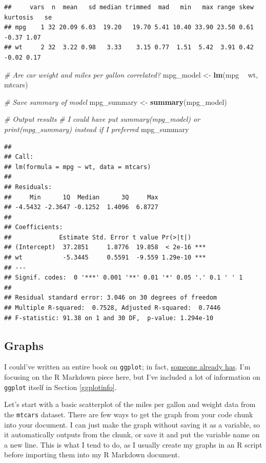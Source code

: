 \documentclass[
  openany]{book}
\newenvironment{Shaded}{\begin{snugshade}}{\end{snugshade}}
\newcommand{\CommentTok}[1]{\textcolor[rgb]{0.56,0.35,0.01}{\textit{#1}}}
\newcommand{\KeywordTok}[1]{\textcolor[rgb]{0.13,0.29,0.53}{\textbf{#1}}}
\newcommand{\NormalTok}[1]{#1}
\newcommand{\OperatorTok}[1]{\textcolor[rgb]{0.81,0.36,0.00}{\textbf{#1}}}
\newcommand{\StringTok}[1]{\textcolor[rgb]{0.31,0.60,0.02}{#1}}
\begin{document}
\begin{verbatim}
##     vars  n  mean   sd median trimmed  mad   min   max range skew kurtosis   se
## mpg    1 32 20.09 6.03  19.20   19.70 5.41 10.40 33.90 23.50 0.61    -0.37 1.07
## wt     2 32  3.22 0.98   3.33    3.15 0.77  1.51  5.42  3.91 0.42    -0.02 0.17
\end{verbatim}

\begin{Shaded}
\begin{Highlighting}[]
\CommentTok{# Are car weight and miles per gallon correlated?}
\NormalTok{mpg_model <-}\StringTok{ }\KeywordTok{lm}\NormalTok{(mpg }\OperatorTok{~}\StringTok{ }\NormalTok{wt, mtcars)}

\CommentTok{# Save summary of model}
\NormalTok{mpg_summary <-}\StringTok{ }\KeywordTok{summary}\NormalTok{(mpg_model)}

\CommentTok{# Output results}
  \CommentTok{# I could have put summary(mpg_model) or print(mpg_summary) instead if I preferred}
\NormalTok{mpg_summary}
\end{Highlighting}
\end{Shaded}

\begin{verbatim}
## 
## Call:
## lm(formula = mpg ~ wt, data = mtcars)
## 
## Residuals:
##     Min      1Q  Median      3Q     Max 
## -4.5432 -2.3647 -0.1252  1.4096  6.8727 
## 
## Coefficients:
##             Estimate Std. Error t value Pr(>|t|)    
## (Intercept)  37.2851     1.8776  19.858  < 2e-16 ***
## wt           -5.3445     0.5591  -9.559 1.29e-10 ***
## ---
## Signif. codes:  0 '***' 0.001 '**' 0.01 '*' 0.05 '.' 0.1 ' ' 1
## 
## Residual standard error: 3.046 on 30 degrees of freedom
## Multiple R-squared:  0.7528, Adjusted R-squared:  0.7446 
## F-statistic: 91.38 on 1 and 30 DF,  p-value: 1.294e-10
\end{verbatim}

\hypertarget{graph}{%
\subsection{Graphs}\label{graph}}

I could've written an entire book on \texttt{ggplot}; in fact, \href{https://ggplot2-book.org/}{someone already has}. I'm focusing on the R Markdown piece here, but I've included a lot of information on \texttt{ggplot} itself in Section \ref{ggplotinfo}.

Let's start with a basic scatterplot of the miles per gallon and weight data from the \texttt{mtcars} dataset. There are few ways to get the graph from your code chunk into your document. I can just make the graph without saving it as a variable, so it automatically outputs from the chunk, or save it and put the variable name on a new line. This is what I tend to do, as I usually create my graphs in an R script before importing them into my R Markdown document.
\end{document}
